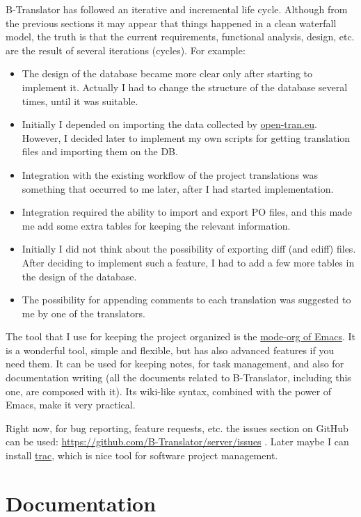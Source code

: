 \documentclass[11pt]{article}
\begin{document}
  B-Translator has followed an iterative and incremental life cycle.
  Although from the previous sections it may appear that things
  happened in a clean waterfall model, the truth is that the current
  requirements, functional analysis, design, etc. are the result of
  several iterations (cycles). For example:
\begin{itemize}
\item The design of the database became more clear only after starting
    to implement it. Actually I had to change the structure of the
    database several times, until it was suitable.
\item Initially I depended on importing the data collected by
    \href{http://open-tran.eu/}{open-tran.eu}. However, I decided later to implement my own scripts
    for getting translation files and importing them on the DB.
\item Integration with the existing workflow of the project translations
    was something that occurred to me later, after I had started
    implementation.
\item Integration required the ability to import and export PO files,
    and this made me add some extra tables for keeping the relevant
    information.
\item Initially I did not think about the possibility of exporting diff
    (and ediff) files.  After deciding to implement such a feature, I
    had to add a few more tables in the design of the database.
\item The possibility for appending comments to each translation was
    suggested to me by one of the translators.
\end{itemize}
  The tool that I use for keeping the project organized is the
  \href{http://orgmode.org/}{mode-org of Emacs}. It is a wonderful tool, simple and flexible, but
  has also advanced features if you need them. It can be used for
  keeping notes, for task management, and also for documentation
  writing (all the documents related to B-Translator, including this
  one, are composed with it). Its wiki-like syntax, combined with the
  power of Emacs, make it very practical.

  Right now, for bug reporting, feature requests, etc. the issues
  section on GitHub can be used:
  \href{https://github.com/B-Translator/server/issues}{https://github.com/B-Translator/server/issues} . Later maybe I
  can install \href{http://trac.edgewall.org/}{trac}, which is nice tool for software project
  management.


\section{Documentation}
\label{sec-8}
\end{document}
